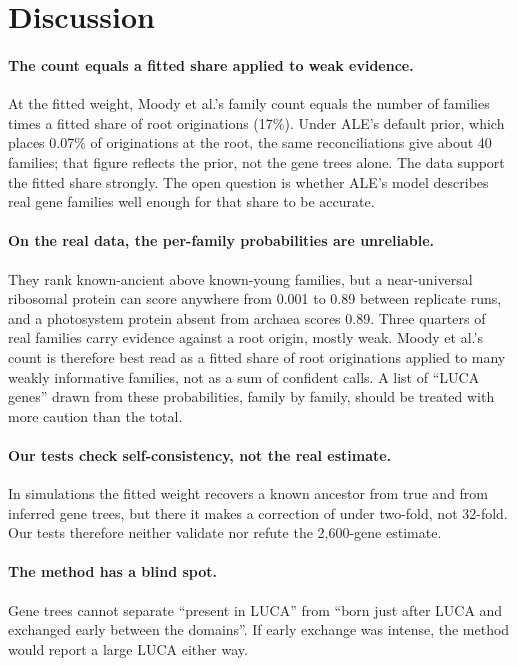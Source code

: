 \documentclass[11pt]{article}
\begin{document}
\section{Discussion}

\paragraph{The count equals a fitted share applied to weak evidence.} At the fitted weight, Moody et al.'s family count equals the number of families times a fitted share of root originations (17\%). Under ALE's default prior, which places 0.07\% of originations at the root, the same reconciliations give about 40 families; that figure reflects the prior, not the gene trees alone. The data support the fitted share strongly. The open question is whether ALE's model describes real gene families well enough for that share to be accurate.

\paragraph{On the real data, the per-family probabilities are unreliable.} They rank known-ancient above known-young families, but a near-universal ribosomal protein can score anywhere from 0.001 to 0.89 between replicate runs, and a photosystem protein absent from archaea scores 0.89. Three quarters of real families carry evidence against a root origin, mostly weak. Moody et al.'s count is therefore best read as a fitted share of root originations applied to many weakly informative families, not as a sum of confident calls. A list of ``LUCA genes'' drawn from these probabilities, family by family, should be treated with more caution than the total.

\paragraph{Our tests check self-consistency, not the real estimate.} In simulations the fitted weight recovers a known ancestor from true and from inferred gene trees, but there it makes a correction of under two-fold, not 32-fold. Our tests therefore neither validate nor refute the 2,600-gene estimate.

\paragraph{The method has a blind spot.} Gene trees cannot separate ``present in LUCA'' from ``born just after LUCA and exchanged early between the domains''. If early exchange was intense, the method would report a large LUCA either way.
\end{document}
